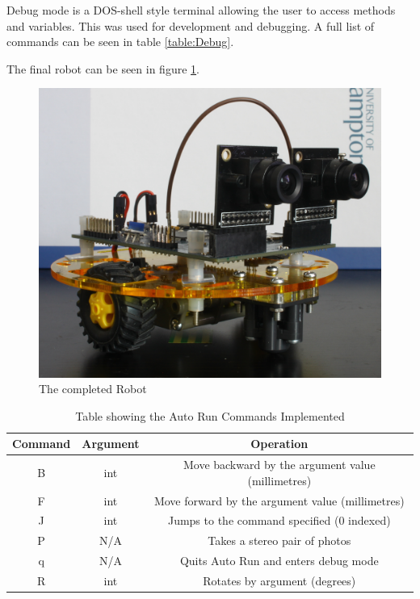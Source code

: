 Debug mode is a DOS-shell style terminal allowing the user to access methods and variables. This was used for development and debugging. A full list of commands can be seen in table \ref{table:Debug}. 

The final robot can be seen in figure \ref{fig:Robot:Complete}.

\begin{figure}
\includegraphics[width=\textwidth]{Figures/Robot.jpg}
\caption{The completed Robot}
\label{fig:Robot:Complete}
\end{figure}

\begin{table}
\centering
\caption{Table showing the Auto Run Commands Implemented}
\label{table:AutoRun}
\begin{tabular}{|c|c|c|}\hline
Command & 	Argument 			& 	Operation \\\hline
B		&	int					&	Move backward by the argument value (millimetres) \\
F		&	int 				&	Move forward by the argument value (millimetres)\\
J		&	int					&	Jumps to the command specified (0 indexed)\\
P		&	N/A					&	Takes a stereo pair of photos\\
q		&	N/A					&	Quits Auto Run and enters debug mode\\
R		& 	int 			 	&	Rotates by argument (degrees)\\\hline
\end{tabular}
\end{table}


